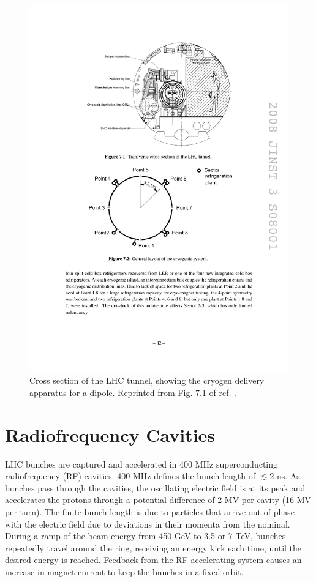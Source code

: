 \documentclass[dissertation.tex]{subfiles}
\begin{document}
\begin{figure}
	\centering
	\includegraphics[scale=1.0]{tunnel_cross_section}
	\caption{Cross section of the LHC tunnel, showing the cryogen delivery apparatus for a dipole.  Reprinted from Fig. 7.1 of ref. \cite{LHC_paper}.}
	\label{fig:tunnel_cross_section}
\end{figure}

\section{Radiofrequency Cavities}
\label{sec:Radiofrequency Cavities}

LHC bunches are captured and accelerated in 400 MHz superconducting radiofrequency (RF) cavities.  400 MHz defines the bunch length of $\lesssim2$ ns.  As bunches pass through the cavities, the oscillating electric field is at its peak and accelerates the protons through a potential difference of 2 MV per cavity (16 MV per turn).  The finite bunch length is due to particles that arrive out of phase with the electric field due to deviations in their momenta from the nominal.  During a ramp of the beam energy from 450 GeV to 3.5 or 7 TeV, bunches repeatedly travel around the ring, receiving an energy kick each time, until the desired energy is reached.  Feedback from the RF accelerating system causes an increase in magnet current to keep the bunches in a fixed orbit.
\end{document}
